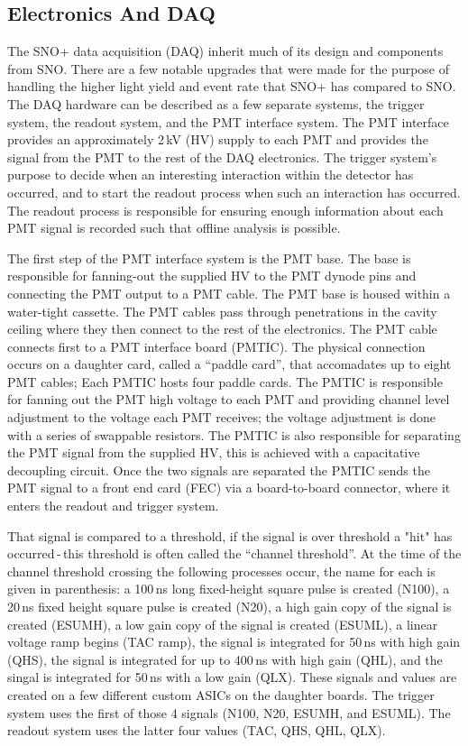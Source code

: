 \subsection{Electronics And DAQ}
The SNO+ data acquisition (DAQ) inherit much of its design and components from
SNO.
There are a few notable upgrades that were made for the purpose of handling the
higher light yield and event rate that SNO+ has compared to SNO.
The DAQ hardware can be described as a few separate systems, the trigger system,
the readout system, and the PMT interface system.
The PMT interface provides an approximately 2\,kV (HV) supply to each PMT and provides
the signal from the PMT to the rest of the DAQ electronics.
The trigger system's purpose to decide when an interesting interaction
within the detector has occurred, and to start the readout process when such an
interaction has occurred.
The readout process is responsible for ensuring enough information about each
PMT signal is recorded such that offline analysis is possible.

The first step of the PMT interface system is the PMT base. The base is responsible
for fanning-out the supplied HV to the PMT dynode pins and connecting the PMT output
to a PMT cable. The PMT base is housed within a water-tight cassette.
The PMT cables pass through penetrations in the cavity ceiling where they then connect
to the rest of the electronics. The PMT cable connects first to a PMT interface
board (PMTIC). The physical connection occurs on a daughter card, called a ``paddle card'',
that accomadates up to eight PMT cables; Each PMTIC hosts four paddle cards.
The PMTIC is responsible for fanning out the PMT high voltage
to each PMT and providing channel level adjustment to the voltage
each PMT receives; the voltage adjustment is done with a series of
swappable resistors.
The PMTIC is also responsible for separating the PMT signal from the supplied
HV, this is achieved with a capacitative decoupling circuit.
Once the two signals are separated the PMTIC sends the PMT signal to
a front end card (FEC) via a board-to-board connector, where it enters
the readout and trigger system.

That signal is compared to a threshold, if the signal is over threshold a "hit"
has occurred\,-\,this threshold is often called the ``channel threshold''.
At the time of the channel threshold crossing the following processes occur, the name for each is given
in parenthesis:
a 100\,ns long fixed-height square pulse is created (N100), a 20\,ns fixed height square pulse is created (N20),
a high gain copy of the signal is created (ESUMH), a low gain copy of the signal
is created (ESUML), a linear voltage ramp begins (TAC ramp), the signal is integrated for
50\,ns with high gain (QHS), the signal is integrated for up to 400\,ns with high gain (QHL),
and the singal is integrated for 50\,ns with a low gain (QLX).
These signals and values are created on a few different custom ASICs on the
daughter boards.
The trigger system uses the first of those 4 signals (N100, N20, ESUMH, and ESUML).
The readout system uses the latter four values (TAC, QHS, QHL, QLX).

